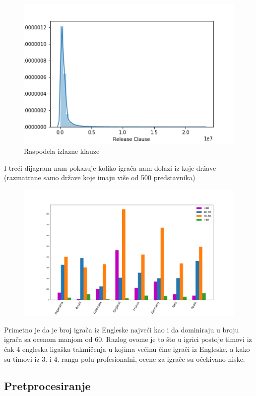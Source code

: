 \documentclass[a4paper, 11pt]{article}
\begin{document}
\begin{figure}[h]

\graphicspath{{../}}
\includegraphics[scale=0.45]{stat2.png}
\caption{Raspodela izlazne klauze}

\end{figure}




I tre\'{c}i dijagram nam pokazuje koliko igra\v{c}a nam dolazi 
iz koje dr\v{z}ave (razmatrane samo dr\v{z}ave koje imaju vi\v{s}e od 500 predstavnika)


\begin{figure}[h]
\centering
\graphicspath{{../}}
\includegraphics[scale=0.285]{stat3.png}
\caption{}

\end{figure}

Primetno je da je broj igra\v{c}a iz Engleske najve\'{c}i kao
i da dominiraju u broju igra\v{c}a sa ocenom manjom od 60.
Razlog ovome je to \v{s}to u igrici postoje timovi iz \v{c}ak
4 engleska liga\v{s}ka takmi\v{c}enja u kojima ve\'{c}inu \v{c}ine
igra\v{c}i iz Engleske, a kako su timovi iz 3. i 4. ranga polu-profesionalni,
ocene za igra\v{c}e su o\v{c}ekivano niske.
\pagebreak

\subsection{Pretprocesiranje}
\end{document}
